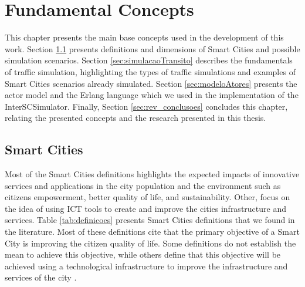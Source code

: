 \chapter{Fundamental Concepts}
\label{cap:conceitos}

This chapter presents the main base concepts used in the development of this work. Section \ref{sec:cidadesInteligentes} presents definitions and dimensions of Smart Cities and possible simulation scenarios. Section \ref{sec:simulacaoTransito} describes the fundamentals of traffic simulation, highlighting the types of traffic simulations and examples of Smart Cities scenarios already simulated. Section \ref{sec:modeloAtores} presents the actor model and the Erlang language which we used in the implementation of the InterSCSimulator. Finally, Section \ref{sec:rev_conclusoes} concludes this chapter, relating the presented concepts and the research presented in this thesis.

\section{Smart Cities}
\label{sec:cidadesInteligentes}

Most of the Smart Cities definitions highlights the expected impacts of innovative services and applications in the city population and the environment such as citizens empowerment, better quality of life, and sustainability. Other, focus on the idea of using ICT tools to create and improve the cities infrastructure and services. Table \ref{tab:definicoes} presents Smart Cities definitions that we found in the literature. Most of these definitions cite that the primary objective of a Smart City is improving the citizen quality of life. Some definitions \cite{giffinger2007smart,guan2012smart} do not establish the mean to achieve this objective, while others define that this objective will be achieved using a technological infrastructure to improve the infrastructure and services of the city \cite{caragliu2011smart,dameri2013searching,harrison2010foundations}.

